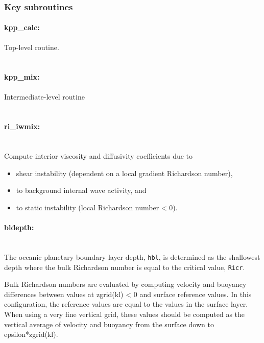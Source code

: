 
\subsubsection{Key subroutines
\label{sec:pkg:kpp:subroutines}}

\paragraph{kpp\_calc:} Top-level routine. \\
~

\paragraph{kpp\_mix:} Intermediate-level routine \\
~

\paragraph{ri\_iwmix:} ~ \\
%
Compute interior viscosity and diffusivity coefficients due to
%
\begin{itemize}
%
\item
shear instability (dependent on a local gradient Richardson number),
%
\item
to background internal wave activity, and
%
\item
to static instability (local Richardson number < 0).
%
\end{itemize}


\paragraph{bldepth:} ~ \\
%
The oceanic planetary boundary layer depth, \texttt{hbl}, is determined as
the shallowest depth where the bulk Richardson number is
equal to the critical value, \texttt{Ricr}.

Bulk Richardson numbers are evaluated by computing velocity and
buoyancy differences between values at zgrid(kl) < 0 and surface
reference values.
In this configuration, the reference values are equal to the
values in the surface layer.
When using a very fine vertical grid, these values should be
computed as the vertical average of velocity and buoyancy from
the surface down to epsilon*zgrid(kl).

